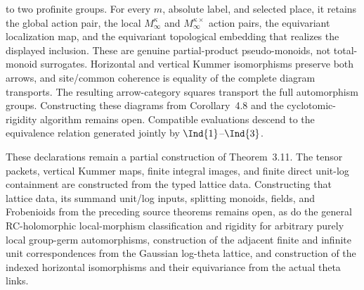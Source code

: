\begin{definition}
  to two profinite groups.  For every \(m\), absolute label, and selected place,
  it retains the global action pair, the local \(M_\infty^\kappa\) and
  \(M_\infty^{\kappa\times}\) action pairs, the equivariant localization map,
  and the equivariant topological embedding that realizes the displayed
  inclusion.  These are genuine partial-product
  pseudo-monoids, not total-monoid surrogates.  Horizontal and vertical Kummer
  isomorphisms preserve both arrows, and site/common coherence is equality of
  the complete diagram transports.  The resulting arrow-category squares
  transport the full automorphism groups.  Constructing these diagrams from
  Corollary~4.8 and the cyclotomic-rigidity algorithm remains open.
  Compatible evaluations descend
  to the equivalence relation generated jointly by \(\Ind{1}\)--\(\Ind{3}\).

  These declarations remain a partial construction of Theorem~3.11.  The
  tensor packets, vertical Kummer maps, finite integral images, and finite
  direct unit-log containment are constructed from the typed lattice data.
  Constructing that lattice data, its summand unit/log inputs, splitting
  monoids, fields, and Frobenioids from the preceding source theorems remains
  open, as do the general RC-holomorphic local-morphism classification and
  rigidity for arbitrary purely local group-germ automorphisms,
  construction of the adjacent finite and infinite unit correspondences from
  the Gaussian log-theta lattice, and construction of the indexed horizontal
  isomorphisms and their equivariance from the actual theta links.
\end{definition}

